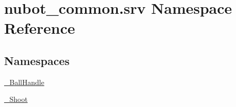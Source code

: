 \hypertarget{namespacenubot__common_1_1srv}{\section{nubot\-\_\-common.\-srv Namespace Reference}
\label{namespacenubot__common_1_1srv}
}
\subsection*{Namespaces}
\begin{DoxyCompactItemize}
\item 
\hyperlink{namespacenubot__common_1_1srv_1_1__BallHandle}{\-\_\-\-Ball\-Handle}
\item 
\hyperlink{namespacenubot__common_1_1srv_1_1__Shoot}{\-\_\-\-Shoot}
\end{DoxyCompactItemize}

